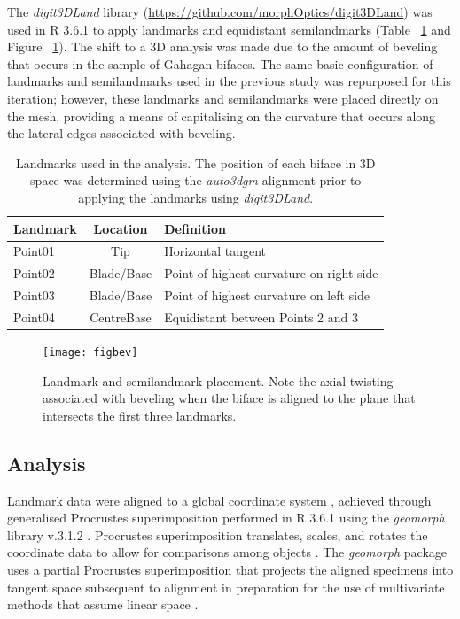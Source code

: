 \documentclass[review]{elsarticle}
\begin{document}
The \textit{digit3DLand} library (\href{https://github.com/morphOptics/digit3DLand}{https://github.com/morphOptics/digit3DLand}) was used in R 3.6.1 \citep{R} to apply landmarks and equidistant semilandmarks (Table ~\ref{tab:Tbl1} and Figure ~\ref{fig:fig5}). The shift to a 3D analysis was made due to the amount of beveling that occurs in the sample of Gahagan bifaces. The same basic configuration of landmarks and semilandmarks used in the previous study \citep[Figure 3]{RN11783} was repurposed for this iteration; however, these landmarks and semilandmarks were placed directly on the mesh, providing a means of capitalising on the curvature that occurs along the lateral edges associated with beveling.

\begin{table}[tbh]\centering
\footnotesize
\caption{Landmarks used in the analysis. The position of each biface in 3D space was determined using the \textit{auto3dgm} alignment prior to applying the landmarks using \textit{digit3DLand}.}
\centering
\begin{tabular}{lcp{7.5cm}}
\toprule
Landmark & Location & Definition\\
\midrule
Point01 & Tip & Horizontal tangent\\
Point02 & Blade/Base & Point of highest curvature on right side\\
Point03 & Blade/Base & Point of highest curvature on left side\\
Point04 & CentreBase & Equidistant between Points 2 and 3\\
\bottomrule
\end{tabular}
\label{tab:Tbl1}
\end{table}

\begin{figure}[ht]\centering
\texttt{[image: figbev]}
\caption{Landmark and semilandmark placement. Note the axial twisting associated with beveling when the biface is aligned to the plane that intersects the first three landmarks.}
\label{fig:fig5}
\end{figure}

\subsection*{Analysis}

Landmark data were aligned to a global coordinate system \citep{RN11622,RN11623,RN11563}, achieved through generalised Procrustes superimposition \citep{RN478} performed in R 3.6.1 \citep{R} using the \textit{geomorph} library v.3.1.2 \citep{RN11530,RN1774}. Procrustes superimposition translates, scales, and rotates the coordinate data to allow for comparisons among objects \citep{RN11564,RN478}. The \textit{geomorph} package uses a partial Procrustes superimposition that projects the aligned specimens into tangent space subsequent to alignment in preparation for the use of multivariate methods that assume linear space \citep{RN1646,RN11563}.
\end{document}
